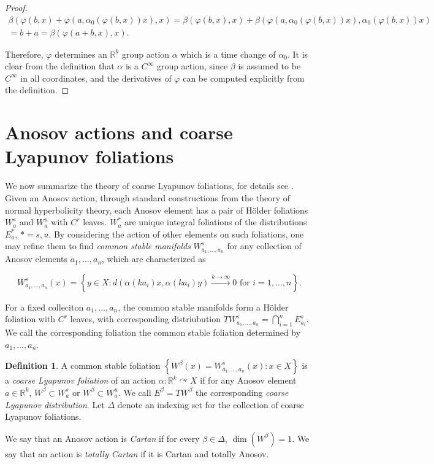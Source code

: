 \documentclass[12pt]{amsart}
\theoremstyle{definition}
\newtheorem{definition}[theorem]{Definition}
\theoremstyle{remark}
\numberwithin{equation}{section}
\newcommand{\R}{\mathbb{R}}
\newcommand{\set}[1]{\left\lbrace #1 \right\rbrace}
\newtheorem{Structural Stability Theorem}[theorem]{Structural Stability Theorem}
\begin{document}
\begin{proof}
\begin{multline*} \beta(\varphi(b,x) +  \varphi(a,\alpha_0(\varphi(b,x))x),x) = \beta(\varphi(b,x),x) + \beta(\varphi(a,\alpha_0(\varphi(b,x))x),\alpha_0(\varphi(b,x))x) \\ = b + a = \beta(\varphi(a+b,x),x).
\end{multline*}

Therefore, $\varphi$ determines an $\R^k$ group action $\alpha$ which is a time change of $\alpha_0$. It is clear from the definition that $\alpha$ is a $C^\infty$ group action, since $\beta$ is assumed to be $C^\infty$ in all coordinates, and the derivatives of $\varphi$ can be computed explicitly from the definition.
\end{proof}












\section{Anosov actions and coarse Lyapunov foliations}
\label{sec:coarse-lyapunov}


We now summarize the theory of coarse Lyapunov foliations, for details see \cite[Section 4.1]{spatzier-vinhage}. Given an Anosov action, through standard constructions from the theory of normal hyperbolicity theory, each Anosov element has a pair of H\"older foliations $W^s_a$ and $W^u_a$ with $C^r$ leaves. $W^*_a$ are unique integral foliations of the distributions $E^*_a$, $* = s,u$. By considering the action of other elements on such foliations, one may refine them to find {\it common stable manifolds} $W^s_{a_1,\dots,a_n}$ for any collection of Anosov elements $a_1,\dots,a_n$, which are characterized as

\[ W^s_{a_1,\dots,a_n}(x) = \set{ y \in X : d(\alpha(ka_i)x,\alpha(ka_i)y) \xrightarrow{k \to \infty} 0 \mbox{ for }i=1,\dots,n}.\]

{  For a fixed colleciton $a_1,\dots,a_n$, the common stable manifolds form a H\"older foliation with $C^r$ leaves, with corresponding distriubution} $TW^s_{a_1,\dots,a_n} = \bigcap_{i=1}^n E^s_{a_i}$. {  We call the corresponding foliation the common stable foliation determined by $a_1,\dots,a_n$.}

\begin{definition}
\label{def:cartan}
A common stable { foliation $\set{W^\beta(x) = W^s_{a_1,\dots,a_n}(x) : x \in X}$} is a {\it coarse Lyapunov foliation} of an action $\alpha : \R^k \curvearrowright X$ if for any Anosov element $a \in \R^k$, $W^\beta \subset W^s_a$ or $W^\beta \subset W^u_a$. We call $E^\beta = TW^\beta$ the corresponding {\it coarse Lyapunov distribution}. Let $\Delta$ denote an indexing set for the collection of coarse Lyapunov foliations.

We say that an Anosov action is {\it Cartan} if for every $\beta \in \Delta$, $\dim(W^\beta) = 1$. We say that an action is {\it totally Cartan} if it is Cartan and totally Anosov.
\end{definition}
\end{document}
